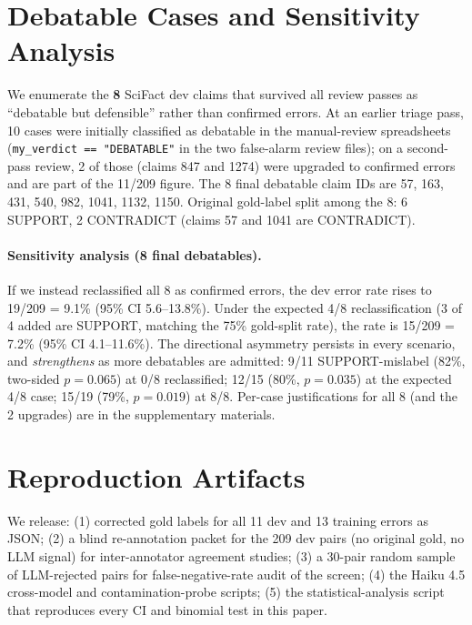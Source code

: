 \documentclass[11pt]{article}
\begin{document}


\appendix

\section{Debatable Cases and Sensitivity Analysis}
\label{app:debatables}

We enumerate the \textbf{8} SciFact dev claims that survived all review passes as ``debatable but defensible'' rather than confirmed errors.
At an earlier triage pass, 10 cases were initially classified as debatable in the manual-review spreadsheets (\texttt{my\_verdict == "DEBATABLE"} in the two false-alarm review files); on a second-pass review, 2 of those (claims 847 and 1274) were upgraded to confirmed errors and are part of the 11/209 figure.
The 8 final debatable claim IDs are 57, 163, 431, 540, 982, 1041, 1132, 1150.
Original gold-label split among the 8: 6 SUPPORT, 2 CONTRADICT (claims 57 and 1041 are CONTRADICT).

\paragraph{Sensitivity analysis (8 final debatables).}
If we instead reclassified all 8 as confirmed errors, the dev error rate rises to 19/209 = 9.1\% (95\% CI 5.6--13.8\%).
Under the expected 4/8 reclassification (3 of 4 added are SUPPORT, matching the 75\% gold-split rate), the rate is 15/209 = 7.2\% (95\% CI 4.1--11.6\%).
The directional asymmetry persists in every scenario, and \emph{strengthens} as more debatables are admitted: 9/11 SUPPORT-mislabel (82\%, two-sided $p{=}0.065$) at 0/8 reclassified; 12/15 (80\%, $p{=}0.035$) at the expected 4/8 case; 15/19 (79\%, $p{=}0.019$) at 8/8.
Per-case justifications for all 8 (and the 2 upgrades) are in the supplementary materials.

\section{Reproduction Artifacts}
\label{app:repro}

We release: (1) corrected gold labels for all 11 dev and 13 training errors as JSON; (2) a blind re-annotation packet for the 209 dev pairs (no original gold, no LLM signal) for inter-annotator agreement studies; (3) a 30-pair random sample of LLM-rejected pairs for false-negative-rate audit of the screen; (4) the Haiku 4.5 cross-model and contamination-probe scripts; (5) the statistical-analysis script that reproduces every CI and binomial test in this paper.
\end{document}
